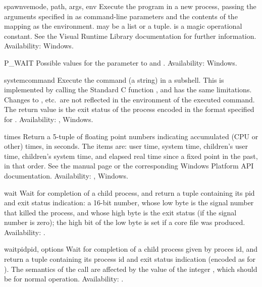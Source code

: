 \begin{funcdesc}{spawnve}{mode, path, args, env}
Execute the program  in a new process, passing the arguments 
specified in  as command-line parameters and the contents of 
the mapping  as the environment.   may be a list or
a tuple.   is a magic operational constant.  See the Visual
\Cpp{} Runtime Library documentation for further information.
Availability: Windows.
\end{funcdesc}

\begin{datadesc}{P_WAIT}
Possible values for the  parameter to 
and .
Availability: Windows.
\end{datadesc}

\begin{funcdesc}{system}{command}
Execute the command (a string) in a subshell.  This is implemented by
calling the Standard C function , and has the
same limitations.  Changes to , 
etc.\ are not reflected in the environment of the executed command.
The return value is the exit status of the process encoded in the
format specified for .
Availability: \UNIX{}, Windows.
\end{funcdesc}

\begin{funcdesc}{times}{}
Return a 5-tuple of floating point numbers indicating accumulated (CPU
or other)
times, in seconds.  The items are: user time, system time, children's
user time, children's system time, and elapsed real time since a fixed
point in the past, in that order.  See the \UNIX{}
manual page  or the corresponding Windows Platform
API documentation.
Availability: \UNIX{}, Windows.
\end{funcdesc}

\begin{funcdesc}{wait}{}
Wait for completion of a child process, and return a tuple containing
its pid and exit status indication: a 16-bit number, whose low byte is
the signal number that killed the process, and whose high byte is the
exit status (if the signal number is zero); the high bit of the low
byte is set if a core file was produced.
Availability: \UNIX{}.
\end{funcdesc}

\begin{funcdesc}{waitpid}{pid, options}
Wait for completion of a child process given by proces id, and return
a tuple containing its process id and exit status indication (encoded
as for ).  The semantics of the call are affected by
the value of the integer , which should be  for
normal operation.
Availability: \UNIX{}.
\end{funcdesc}

